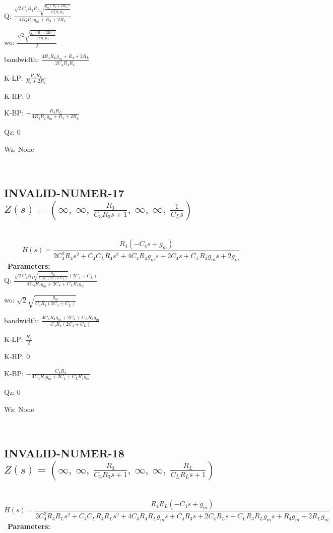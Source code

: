 \documentclass{article}
\begin{document}
Q: $\frac{\sqrt{2} C_{4} R_{4} R_{L} \sqrt{\frac{g_{m} \left(R_{4} + 2 R_{L}\right)}{C_{4}^{2} R_{4} R_{L}}}}{4 R_{4} R_{L} g_{m} + R_{4} + 2 R_{L}}$\ 

wo: $\frac{\sqrt{2} \sqrt{\frac{g_{m} \left(R_{4} + 2 R_{L}\right)}{C_{4}^{2} R_{4} R_{L}}}}{2}$\ 

bandwidth: $\frac{4 R_{4} R_{L} g_{m} + R_{4} + 2 R_{L}}{2 C_{4} R_{4} R_{L}}$\ 

K-LP: $\frac{R_{4} R_{L}}{R_{4} + 2 R_{L}}$\ 

K-HP: $0$\ 

K-BP: $- \frac{R_{4} R_{L}}{4 R_{4} R_{L} g_{m} + R_{4} + 2 R_{L}}$\ 

Qz: $0$\ 

Wz: $\text{None}$\ 

\ 

\subsection{INVALID-NUMER-17 $Z(s) = \left( \infty, \  \infty, \  \frac{R_{3}}{C_{3} R_{3} s + 1}, \  \infty, \  \infty, \  \frac{1}{C_{L} s}\right)$ } \ 
\textbf{\[H(s) = \frac{R_{4} \left(- C_{4} s + g_{m}\right)}{2 C_{4}^{2} R_{4} s^{2} + C_{4} C_{L} R_{4} s^{2} + 4 C_{4} R_{4} g_{m} s + 2 C_{4} s + C_{L} R_{4} g_{m} s + 2 g_{m}}\] } \ 
\textbf{Parameters:}\\ 

Q: $\frac{\sqrt{2} C_{4} R_{4} \sqrt{\frac{g_{m}}{C_{4} R_{4} \left(2 C_{4} + C_{L}\right)}} \left(2 C_{4} + C_{L}\right)}{4 C_{4} R_{4} g_{m} + 2 C_{4} + C_{L} R_{4} g_{m}}$\ 

wo: $\sqrt{2} \sqrt{\frac{g_{m}}{C_{4} R_{4} \left(2 C_{4} + C_{L}\right)}}$\ 

bandwidth: $\frac{4 C_{4} R_{4} g_{m} + 2 C_{4} + C_{L} R_{4} g_{m}}{C_{4} R_{4} \left(2 C_{4} + C_{L}\right)}$\ 

K-LP: $\frac{R_{4}}{2}$\ 

K-HP: $0$\ 

K-BP: $- \frac{C_{4} R_{4}}{4 C_{4} R_{4} g_{m} + 2 C_{4} + C_{L} R_{4} g_{m}}$\ 

Qz: $0$\ 

Wz: $\text{None}$\ 

\ 

\subsection{INVALID-NUMER-18 $Z(s) = \left( \infty, \  \infty, \  \frac{R_{3}}{C_{3} R_{3} s + 1}, \  \infty, \  \infty, \  \frac{R_{L}}{C_{L} R_{L} s + 1}\right)$ } \ 
\textbf{\[H(s) = \frac{R_{4} R_{L} \left(- C_{4} s + g_{m}\right)}{2 C_{4}^{2} R_{4} R_{L} s^{2} + C_{4} C_{L} R_{4} R_{L} s^{2} + 4 C_{4} R_{4} R_{L} g_{m} s + C_{4} R_{4} s + 2 C_{4} R_{L} s + C_{L} R_{4} R_{L} g_{m} s + R_{4} g_{m} + 2 R_{L} g_{m}}\] } \ 
\textbf{Parameters:}\\ 
\end{document}
